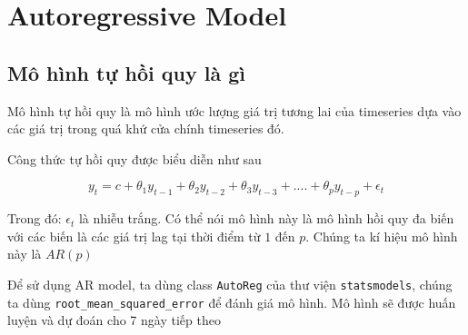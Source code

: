 \documentclass[
]{book}
\begin{document}
\hypertarget{autoregressive-model}{%
\chapter{Autoregressive Model}\label{autoregressive-model}}

\hypertarget{muxf4-huxecnh-tux1ef1-hux1ed3i-quy-luxe0-guxec}{%
\section{Mô hình tự hồi quy là gì}\label{muxf4-huxecnh-tux1ef1-hux1ed3i-quy-luxe0-guxec}}

Mô hình tự hồi quy là mô hình ước lượng giá trị tương lai của timeseries dựa vào các giá trị trong quá khứ cửa chính timeseries đó.

Công thức tự hồi quy được biểu diễn như sau

\[
y_t = c + \theta_1 y_{t-1} + \theta_2 y_{t-2} + \theta_3 y_{t-3} + .... + \theta_p y_{t-p} + \epsilon_t
\]

Trong đó: \(\epsilon_t\) là nhiễu trắng. Có thể nói mô hình này là mô hình hồi quy đa biến với các biến là các giá trị lag tại thời điểm từ \(1\) đến \(p\). Chúng ta kí hiệu mô hình này là \(AR(p)\)

Để sử dụng AR model, ta dùng class \texttt{AutoReg} của thư viện \texttt{statsmodels}, chúng ta dùng \texttt{root\_mean\_squared\_error} để đánh giá mô hình. Mô hình sẽ được huấn luyện và dự đoán cho 7 ngày tiếp theo
\end{document}
